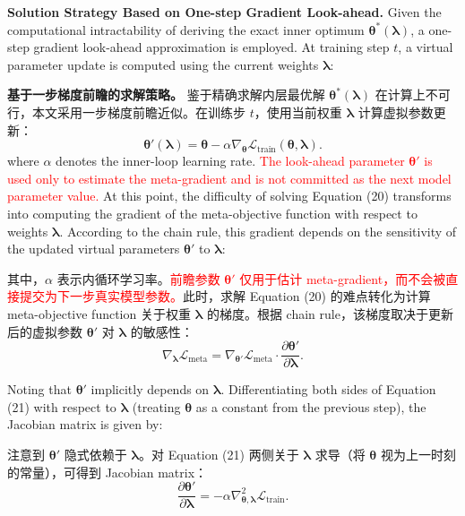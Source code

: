 \documentclass[11pt]{article}
\begin{document}
\textbf{Solution Strategy Based on One-step Gradient Look-ahead.} Given the computational intractability of deriving the exact inner optimum $\boldsymbol{\theta}^*(\boldsymbol{\lambda})$, a one-step gradient look-ahead approximation is employed. At training step $t$, a virtual parameter update is computed using the current weights $\boldsymbol{\lambda}$:

\textbf{基于一步梯度前瞻的求解策略。} 鉴于精确求解内层最优解 $\boldsymbol{\theta}^*(\boldsymbol{\lambda})$ 在计算上不可行，本文采用一步梯度前瞻近似。在训练步 $t$，使用当前权重 $\boldsymbol{\lambda}$ 计算虚拟参数更新：
\begin{equation}
	\boldsymbol{{\theta }'}(\boldsymbol{\lambda })=\boldsymbol{\theta }-\alpha {{\nabla }_{\boldsymbol{\theta }}}{{\mathcal{L}}_{\text{train}}}(\boldsymbol{\theta },\boldsymbol{\lambda }).
\end{equation}
where $\alpha$ denotes the inner-loop learning rate. \textcolor{red}{The look-ahead parameter $\boldsymbol{\theta}'$ is used only to estimate the meta-gradient and is not committed as the next model parameter value.} At this point, the difficulty of solving Equation (20) transforms into computing the gradient of the meta-objective function with respect to weights $\boldsymbol{\lambda}$. According to the chain rule, this gradient depends on the sensitivity of the updated virtual parameters $\boldsymbol{\theta}'$ to $\boldsymbol{\lambda}$:

其中，$\alpha$ 表示内循环学习率。\textcolor{red}{前瞻参数 $\boldsymbol{\theta}'$ 仅用于估计 meta-gradient，而不会被直接提交为下一步真实模型参数。}此时，求解 Equation (20) 的难点转化为计算 meta-objective function 关于权重 $\boldsymbol{\lambda}$ 的梯度。根据 chain rule，该梯度取决于更新后的虚拟参数 $\boldsymbol{\theta}'$ 对 $\boldsymbol{\lambda}$ 的敏感性：
\begin{equation}
	{{\nabla }_{\boldsymbol{\lambda }}}{{\mathcal{L}}_{\text{meta}}}={{\nabla }_{{\boldsymbol{{\theta }'}}}}{{\mathcal{L}}_{\text{meta}}}\cdot \frac{\partial \boldsymbol{{\theta }'}}{\partial \boldsymbol{\lambda }}.
\end{equation}

Noting that $\boldsymbol{\theta}'$ implicitly depends on $\boldsymbol{\lambda}$. Differentiating both sides of Equation (21) with respect to $\boldsymbol{\lambda}$ (treating $\boldsymbol{\theta}$ as a constant from the previous step), the Jacobian matrix is given by:

注意到 $\boldsymbol{\theta}'$ 隐式依赖于 $\boldsymbol{\lambda}$。对 Equation (21) 两侧关于 $\boldsymbol{\lambda}$ 求导（将 $\boldsymbol{\theta}$ 视为上一时刻的常量），可得到 Jacobian matrix：
\begin{equation}
	\frac{\partial \boldsymbol{{\theta }'}}{\partial \boldsymbol{\lambda }}=-\alpha \nabla _{\boldsymbol{\theta },\boldsymbol{\lambda }}^{2}{{\mathcal{L}}_{\text{train}}}.
\end{equation}
\end{document}

